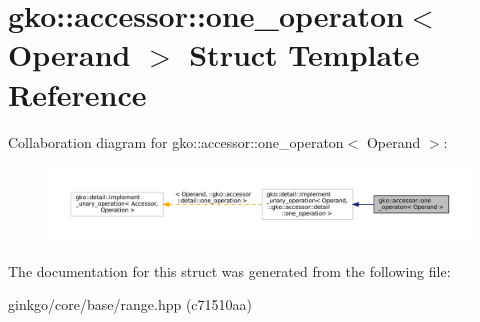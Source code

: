 \hypertarget{structgko_1_1accessor_1_1one__operaton}{}\section{gko\+:\+:accessor\+:\+:one\+\_\+operaton$<$ Operand $>$ Struct Template Reference}
\label{structgko_1_1accessor_1_1one__operaton}


Collaboration diagram for gko\+:\+:accessor\+:\+:one\+\_\+operaton$<$ Operand $>$\+:
\nopagebreak
\begin{figure}[H]
\begin{center}
\leavevmode
\includegraphics[width=350pt]{structgko_1_1accessor_1_1one__operaton__coll__graph}
\end{center}
\end{figure}


The documentation for this struct was generated from the following file\+:\begin{DoxyCompactItemize}
\item 
ginkgo/core/base/range.\+hpp (c71510aa)\end{DoxyCompactItemize}
